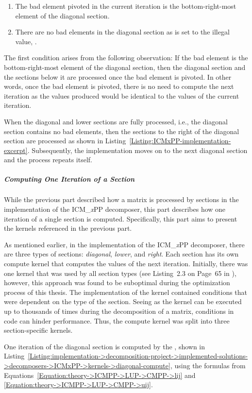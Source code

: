 \begin{enumerate}
	\item The bad element pivoted in the current iteration is the bottom-right-most element of the diagonal section.
	\item There are no bad elements in the diagonal section as  is set to the illegal value, .
\end{enumerate}

The first condition arises from the following observation: If the bad element is the bottom-right-most element of the diagonal section, then the diagonal section and the sections below it are processed once the bad element is pivoted.
In other words, once the bad element is pivoted, there is no need to compute the next iteration as the values produced would be identical to the values of the current iteration.

When the diagonal and lower sections are fully processed, i.e., the diagonal section contains no bad elements, then the sections to the right of the diagonal section are processed as shown in Listing~\ref{Listing:ICMxPP-implementation-excerpt}.
Subsequently, the implementation moves on to the next diagonal section and the process repeats itself.

\subparagraph{Computing One Iteration of a Section} While the previous part described how a matrix is processed by sections in the implementation of the ICM\_\textit{x}PP decomposer, this part describes how one iteration of a single section is computed.
Specifically, this part aims to present the kernels referenced in the previous part.

As mentioned earlier, in the implementation of the ICM\_\textit{x}PP decomposer, there are three types of sections: \textit{diagonal}, \textit{lower}, and \textit{right}.
Each section has its own compute kernel that computes the values of the next iteration.
Initially, there was one kernel that was used by all section types (see Listing~2.3 on Page~65 in  \cite{Cejka2022}), however, this approach was found to be suboptimal during the optimization process of this thesis.
The implementation of the kernel contained conditions that were dependent on the type of the section.
Seeing as the kernel can be executed up to thousands of times during the decomposition of a matrix, conditions in code can hinder performance.
Thus, the compute kernel was split into three section-specific kernels.

One iteration of the diagonal section is computed by the , shown in Listing~\ref{Listing:implementation->decomposition-project->implemented-solutions->decomposers->ICMxPP->kernels->diagonal-compute}, using the formulas from Equations~\ref{Equation:theory->ICMPP->LUP->CMPP->lij} and \ref{Equation:theory->ICMPP->LUP->CMPP->uij}.

